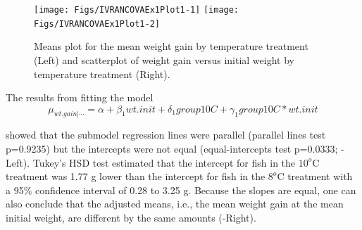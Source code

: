 \documentclass[10pt,openany]{book}\usepackage[]{graphicx}\usepackage[]{color}
\newenvironment{knitrout}{}{} %
\begin{document}
\begin{knitrout}
\color{fgcolor}\begin{figure}[h]

{\centering \texttt{[image: Figs/IVRANCOVAEx1Plot1-1]} 
\texttt{[image: Figs/IVRANCOVAEx1Plot1-2]} 

}

\caption[Means plot for the mean weight gain by temperature treatment (Left) and scatterplot of weight gain versus initial weight by temperature treatment (Right)]{Means plot for the mean weight gain by temperature treatment (Left) and scatterplot of weight gain versus initial weight by temperature treatment (Right).}\label{fig:IVRANCOVAEx1Plot1}
\end{figure}


\end{knitrout}
\vspace{9pt}
The results from fitting the model
\[ \mu_{wt.gain|\cdots}=\alpha+\beta_{1}wt.init+\delta_{1}group10C+\gamma_{1}group10C*wt.init \]

showed that the submodel regression lines were parallel (parallel lines test p=0.9235) but the intercepts were not equal (equal-intercepts test p=0.0333; -Left).  Tukey's HSD test estimated that the intercept for fish in the $10^{o}$C treatment was 1.77 g lower than the intercept for fish in the $8^{o}$C treatment with a 95\% confidence interval of 0.28 to 3.25 g.  Because the slopes are equal, one can also conclude that the adjusted means, i.e., the mean weight gain at the mean initial weight, are different by the same amounts (-Right).
\end{document}
